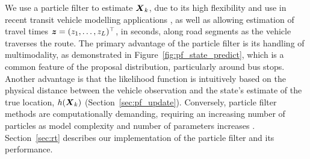 We use a particle filter to estimate $\mbox{$\boldsymbol{X}$}_k$,
due to its high flexibility and use in recent 
transit vehicle modelling applications \citep{Hans_2015},
as well as allowing estimation of travel times
$\boldsymbol{z} = (z_1,\ldots,z_L)^\top$, in seconds, along road segments
as the vehicle traverses the route.
The primary advantage of the particle filter is its handling of multimodality,
as demonstrated in Figure~\ref{fig:pf_state_predict},
which is a common feature of the proposal distribution, particularly around bus stops.
Another advantage is that the likelihood function is intuitively based
on the physical distance between the vehicle observation and the state's
estimate of the true location, $h(\mbox{$\boldsymbol{X}$}_k)$ (Section~\ref{sec:pf_update}).
Conversely, particle filter methods are computationally demanding,
requiring an increasing number of particles as model complexity and
number of parameters increases \citep{Carpenter_1999}.
Section~\ref{sec:rt} describes our implementation of the particle filter
and its \rt performance.



